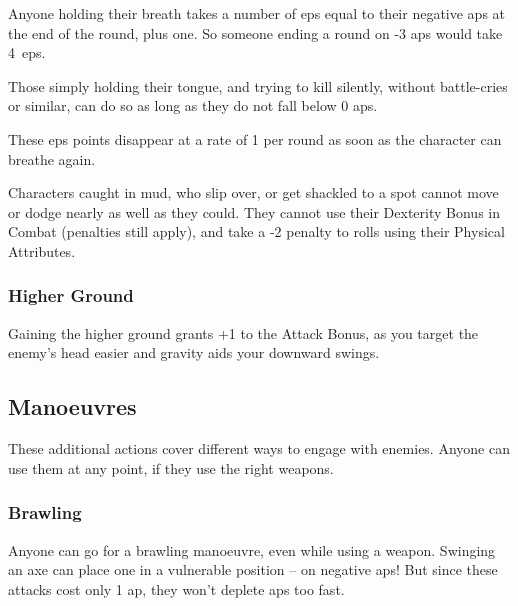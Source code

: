 \begin{multicols}{2}
Anyone holding their breath takes a number of \glspl{ep} equal to their negative \glspl{ap} at the end of the round, plus one.
So someone ending a round on -3 \glspl{ap} would take 4~\glspl{ep}.

Those simply holding their tongue, and trying to kill silently, without battle-cries or similar, can do so as long as they do not fall below 0 \glspl{ap}.

These \glspl{ep} points disappear at a rate of 1 per round as soon as the character can breathe again.

\label{trapped}
\label{prone}

Characters caught in mud, who slip over, or get shackled to a spot cannot move or dodge nearly as well as they could.
They cannot use their Dexterity Bonus in Combat (penalties still apply), and take a -2 penalty to rolls using their Physical Attributes.

\subsubsection[+1 to attack]{Higher Ground}

Gaining the higher ground grants +1 to the Attack Bonus, as you target the enemy's head easier and gravity aids your downward swings.

\subsection{Manoeuvres}

These additional actions cover different ways to engage with enemies.
Anyone can use them at any point, if they use the right weapons.

\subsubsection[Brawling: Make a normal attack roll, but any attack with a Margin less than 5 only inflicts \glspl{ep} rather than Damage]{Brawling}

Anyone can go for a brawling manoeuvre, even while using a weapon.
Swinging an axe can place one in a vulnerable position -- on negative \glspl{ap}!
But since these attacks cost only 1 \gls{ap}, they won't deplete \glspl{ap} too fast.


\end{multicols}
